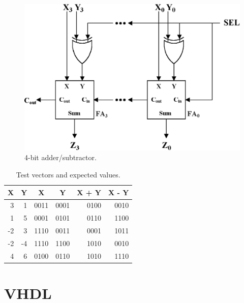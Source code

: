 \documentclass{article}
\begin{document}
\begin{figure}[hbtp]
  \centering
  \includegraphics[width=\textwidth]{adder}
  \caption{\label{fig:adder} 4-bit adder/subtractor.}
\end{figure}

\begin{table}[hbtp]
  \centering
  \begin{tabular}{r|r|c|c|r|r}
    X  & Y  & X    & Y    & X + Y & X - Y \\
    \hline
    3  & 1  & 0011 & 0001 & 0100  & 0010  \\
    1  & 5  & 0001 & 0101 & 0110  & 1100  \\
    -2 & 3  & 1110 & 0011 & 0001  & 1011  \\
    -2 & -4 & 1110 & 1100 & 1010  & 0010  \\
    4  & 6  & 0100 & 0110 & 1010  & 1110  \\
\end{tabular}
  \caption{\label{tab:values}Test vectors and expected values.}
\end{table}

\section{VHDL}
\label{sec:vhdl}
\end{document}
